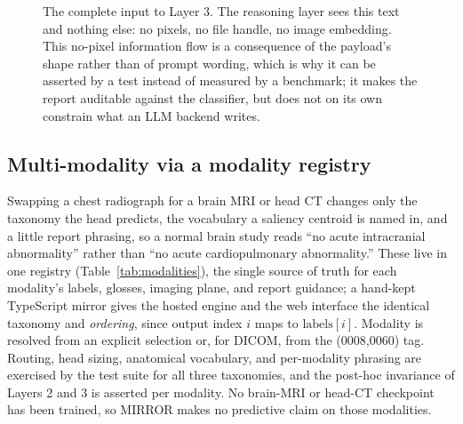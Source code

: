 \documentclass[conference]{IEEEtran}
\begin{document}
\begin{figure}[tbp]
\centering
{}
\caption{The complete input to Layer 3. The reasoning layer sees this text and
nothing else: no pixels, no file handle, no image embedding. This no-pixel
information flow is a consequence of the payload's shape rather than of prompt
wording, which is why it can be asserted by a test instead of measured by a
benchmark; it makes the report auditable against the classifier, but does not on its
own constrain what an LLM backend writes.}
\label{fig:evidence}
\end{figure}

\subsection{Multi-modality via a modality registry}
Swapping a chest radiograph for a brain MRI or head CT changes only the taxonomy
the head predicts, the vocabulary a saliency centroid is named in, and a little
report phrasing, so a normal brain study reads ``no acute intracranial
abnormality'' rather than ``no acute cardiopulmonary abnormality.'' These live in
one registry (Table~\ref{tab:modalities}), the single source of truth for each
modality's labels, glosses, imaging plane, and report guidance; a hand-kept
TypeScript mirror gives the hosted engine and the web interface the identical
taxonomy and \emph{ordering}, since output index $i$ maps to $\text{labels}[i]$.
Modality is resolved from an explicit selection or, for DICOM, from the (0008,0060)
tag. Routing, head sizing, anatomical vocabulary, and per-modality phrasing are
exercised by the test suite for all three taxonomies, and the post-hoc invariance
of Layers 2 and 3 is asserted per modality. No brain-MRI or head-CT checkpoint has
been trained, so MIRROR makes no predictive claim on those modalities.
\end{document}
